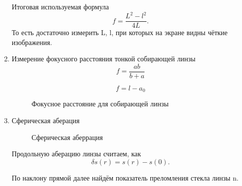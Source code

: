 \documentclass[a4paper,12pt]{article}
\theoremstyle{plain} %
\theoremstyle{definition} %
\theoremstyle{remark} %
\begin{document}
\begin{enumerate}
    Итоговая используемая формула \[f = \frac{L^2 - l^2}{4L}.\] 
    То есть достаточно измерить L, l, при которых на экране видны чёткие изображения.
 
    \item Измерение фокусного расстояния тонкой собирающей линзы
    \[f = \frac{ab}{b + a}\]
 	\begin{figure}[h!]
 		\caption{Фокусное расстояние для собирающей линзы}
 		
 		\[  f = l - a_0    \]
 	\end{figure}
    \item Сферическая аберация
        \begin{figure}[h!]
        \caption{Сферическая аберрация}
        \end{figure}
 
    Продольную аберацию линзы считаем, как \[\delta{}s(r) = s(r) - s(0).\]
 
    По наклону прямой далее найдём показатель преломления стекла линзы n.
 
 
\end{enumerate}
 
\end{document}
